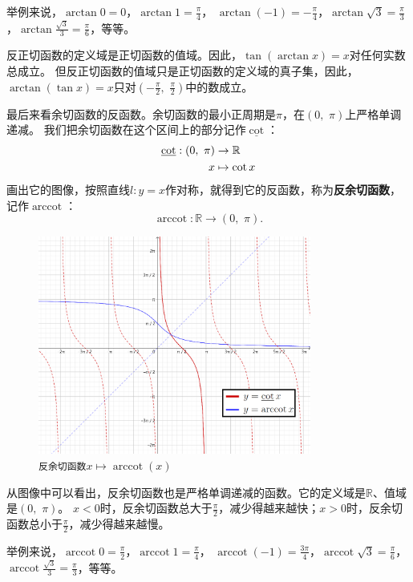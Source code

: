 \documentclass[12pt,UTF8]{ctexbook}
\newcommand{\arccot}{\operatorname{arccot}}
\begin{document}
举例来说，$\arctan{0} = 0$，$\arctan{1} = \frac{\pi}{4}$，
$\arctan{(-1)} = -\frac{\pi}{4}$，$\arctan{\sqrt{3}} = \frac{\pi}{3}$，$\arctan{\frac{\sqrt{3}}{3}} = \frac{\pi}{6}$，等等。

反正切函数的定义域是正切函数的值域。因此，$\tan{(\arctan{x})} = x$对任何实数总成立。
但反正切函数的值域只是正切函数的定义域的真子集，因此，$\arctan{(\tan{x})} = x$只对$(-\frac{\pi}{2}, \,\, \frac{\pi}{2})$中的数成立。

最后来看余切函数的反函数。余切函数的最小正周期是$\pi$，在$(0, \,\, \pi)$上严格单调递减。
我们把余切函数在这个区间上的部分记作$\underline{\cot}$：
\begin{align}
    \underline{\cot} : (0, \,\, \pi) &\rightarrow \mathbb{R} \notag \\
                                   x &\mapsto \cot{x} \notag
\end{align}
画出它的图像，按照直线$l: y = x$作对称，就得到它的反函数，称为\textbf{反余切函数}，记作$\arccot$：
$$ \arccot : \mathbb{R} \rightarrow (0, \,\, \pi) . $$

\begin{figure}[h] %
    \vspace{4pt}
    \centering
    \includegraphics[width=0.8\textwidth]{反余切函数1.png}
    \caption*{\texttt{反余切函数}$x\mapsto \arccot(x)$}
\end{figure}

从图像中可以看出，反余切函数也是严格单调递减的函数。它的定义域是$\mathbb{R}$、值域是$(0, \,\, \pi)$。
$x < 0$时，反余切函数总大于$\frac{\pi}{2}$，减少得越来越快；$x > 0$时，反余切函数总小于$\frac{\pi}{2}$，减少得越来越慢。

举例来说，$\arccot{0} = \frac{\pi}{2}$，$\arccot{1} = \frac{\pi}{4}$，
$\arccot{(-1)} = \frac{3\pi}{4}$，$\arccot{\sqrt{3}} = \frac{\pi}{6}$，$\arccot{\frac{\sqrt{3}}{3}} = \frac{\pi}{3}$，等等。
\end{document}
